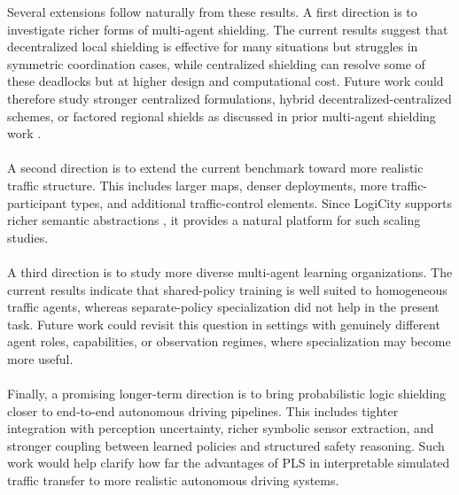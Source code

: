 Several extensions follow naturally from these results. A first direction is to investigate richer forms of multi-agent shielding. The current results suggest that decentralized local shielding is effective for many situations but struggles in symmetric coordination cases, while centralized shielding can resolve some of these deadlocks but at higher design and computational cost. Future work could therefore study stronger centralized formulations, hybrid decentralized-centralized schemes, or factored regional shields as discussed in prior multi-agent shielding work \cite{elsayedaly2021safemultiagentreinforcementlearning}.
\\
\\
A second direction is to extend the current benchmark toward more realistic traffic structure. This includes larger maps, denser deployments, more traffic-participant types, and additional traffic-control elements. Since LogiCity supports richer semantic abstractions \cite{li2025logicityadvancingneurosymbolicai}, it provides a natural platform for such scaling studies.
\\
\\
A third direction is to study more diverse multi-agent learning organizations. The current results indicate that shared-policy training is well suited to homogeneous traffic agents, whereas separate-policy specialization did not help in the present task. Future work could revisit this question in settings with genuinely different agent roles, capabilities, or observation regimes, where specialization may become more useful.
\\
\\
Finally, a promising longer-term direction is to bring probabilistic logic shielding closer to end-to-end autonomous driving pipelines. This includes tighter integration with perception uncertainty, richer symbolic sensor extraction, and stronger coupling between learned policies and structured safety reasoning. Such work would help clarify how far the advantages of PLS in interpretable simulated traffic transfer to more realistic autonomous driving systems.
